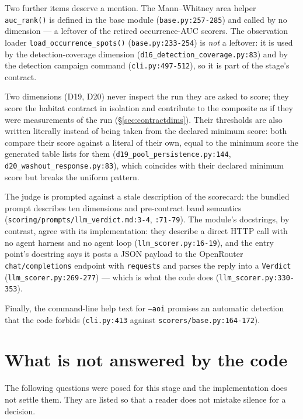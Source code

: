 \documentclass[11pt,a4paper]{article}
\newcommand{\code}[1]{\texttt{#1}}
\begin{document}
Two further items deserve a mention. The Mann--Whitney area helper
\code{auc\_rank()} is defined in the base module (\code{base.py:257-285})
and called by no dimension --- a leftover of the retired occurrence-AUC
scorers. The observation loader \code{load\_occurrence\_spots()}
(\code{base.py:233-254}) is \emph{not} a leftover: it is used by the
detection-coverage dimension (\code{d16\_detection\_coverage.py:83}) and by
the detection campaign command (\code{cli.py:497-512}), so it is part of
the stage's contract.

Two dimensions (D19, D20) never inspect the run they are asked to score;
they score the habitat contract in isolation and contribute to the
composite as if they were measurements of the run
(\S\ref{sec:contractdims}). Their thresholds are also written literally
instead of being taken from the declared minimum score: both compare their
score against a literal of their own, equal to the minimum score the
generated table lists for them (\code{d19\_pool\_persistence.py:144},
\code{d20\_washout\_response.py:83}), which coincides with their declared
minimum score but breaks the uniform pattern.

The judge is prompted against a stale description of the scorecard: the
bundled prompt describes ten dimensions and pre-contract band semantics
(\code{scoring/prompts/llm\_verdict.md:3-4}, \code{:71-79}). The module's
docstrings, by contrast, agree with its implementation: they describe a
direct HTTP call with no agent harness and no agent loop
(\code{llm\_scorer.py:16-19}), and the entry point's docstring says it
posts a JSON payload to the OpenRouter \code{chat/completions} endpoint
with \code{requests} and parses the reply into a \code{Verdict}
(\code{llm\_scorer.py:269-277}) --- which is what the code does
(\code{llm\_scorer.py:330-353}).

Finally, the command-line help text for \code{--aoi} promises an automatic
detection that the code forbids (\code{cli.py:413} against
\code{scorers/base.py:164-172}).

\section{What is not answered by the code}

The following questions were posed for this stage and the implementation does
not settle them. They are listed so that a reader does not mistake silence
for a decision.
\end{document}
